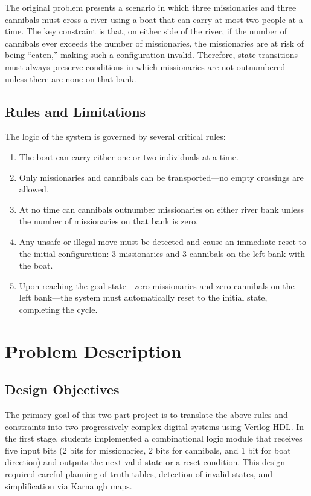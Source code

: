 \documentclass[10pt,a4paper]{article}
\begin{document}
\noindent The original problem presents a scenario in which three missionaries and three cannibals must cross a river using a boat that can carry at most two people at a time. The key constraint is that, on either side of the river, if the number of cannibals ever exceeds the number of missionaries, the missionaries are at risk of being “eaten,” making such a configuration invalid. Therefore, state transitions must always preserve conditions in which missionaries are not outnumbered unless there are none on that bank.

\subsection*{Rules and Limitations}

\noindent The logic of the system is governed by several critical rules:

\begin{enumerate}
    \item The boat can carry either one or two individuals at a time.
    \item Only missionaries and cannibals can be transported—no empty crossings are allowed.
    \item At no time can cannibals outnumber missionaries on either river bank unless the number of missionaries on that bank is zero.
    \item Any unsafe or illegal move must be detected and cause an immediate reset to the initial configuration: 3 missionaries and 3 cannibals on the left bank with the boat.
    \item Upon reaching the goal state—zero missionaries and zero cannibals on the left bank—the system must automatically reset to the initial state, completing the cycle.
\end{enumerate}

\section*{Problem Description}

\subsection*{Design Objectives}

\noindent The primary goal of this two-part project is to translate the above rules and constraints into two progressively complex digital systems using Verilog HDL. In the first stage, students implemented a combinational logic module that receives five input bits (2 bits for missionaries, 2 bits for cannibals, and 1 bit for boat direction) and outputs the next valid state or a reset condition. This design required careful planning of truth tables, detection of invalid states, and simplification via Karnaugh maps.\\
\end{document}
